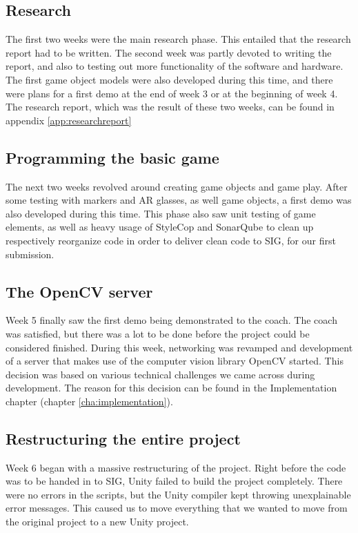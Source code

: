 		\subsection{Research} \label{ssec:research}
			The first two weeks were the main research phase. This entailed that the
			research report had to be written. The second week was partly devoted
			to writing the report, and also to testing out more functionality of
			the software and hardware. The first game object models were also
			developed during this time, and there were plans for a first demo at the end
			of week 3 or at the beginning of week 4. The research report, which was the 
			result of these two weeks, can be found in appendix \ref{app:researchreport}
		
		\subsection{Programming the basic game} \label{ssec:basics}
			The next two weeks revolved around creating game objects and game play.
			After some testing with markers and AR glasses, as well game objects, a 
			first demo was also developed during this time. This phase also saw unit testing of game
			elements, as well as heavy usage of StyleCop and SonarQube to clean up
			respectively reorganize code in order to deliver clean code to SIG, for our first
			submission.  
		
		\subsection{The OpenCV server} \label{ssec:firstdemo}
			Week 5 finally saw the first demo being demonstrated to the coach. The
			coach was satisfied, but there was a lot to be done before the project
			could be considered finished. During this week, networking was revamped
			and development of a server that makes use of the computer vision library
			OpenCV started. This decision was based on various technical challenges we 
			came across during development. The reason for this decision can be found 
			in the Implementation chapter (chapter \ref{cha:implementation}).
		
		\subsection{Restructuring the entire project}
			Week 6 began with a massive restructuring of the project. Right before
			the code was to be handed in to SIG, Unity failed to build the project
			completely. There were no errors in the scripts, but the Unity compiler
			kept throwing unexplainable error messages. This caused us to move 
			everything that we wanted to move from the original project to a new
			Unity project.
			

